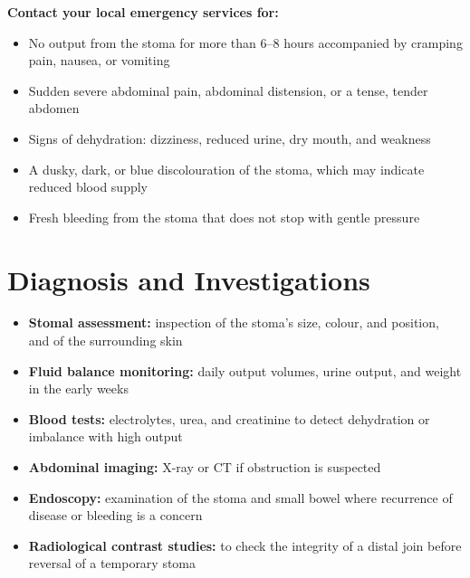 \textbf{Contact your local emergency services for:}
\begin{itemize}
    \item No output from the stoma for more than 6--8 hours accompanied by cramping pain, nausea, or vomiting
    \item Sudden severe abdominal pain, abdominal distension, or a tense, tender abdomen
    \item Signs of dehydration: dizziness, reduced urine, dry mouth, and weakness
    \item A dusky, dark, or blue discolouration of the stoma, which may indicate reduced blood supply
    \item Fresh bleeding from the stoma that does not stop with gentle pressure
\end{itemize}

\section*{Diagnosis and Investigations}
\begin{itemize}
    \item \textbf{Stomal assessment:} inspection of the stoma's size, colour, and position, and of the surrounding skin
    \item \textbf{Fluid balance monitoring:} daily output volumes, urine output, and weight in the early weeks
    \item \textbf{Blood tests:} electrolytes, urea, and creatinine to detect dehydration or imbalance with high output
    \item \textbf{Abdominal imaging:} X-ray or CT if obstruction is suspected
    \item \textbf{Endoscopy:} examination of the stoma and small bowel where recurrence of disease or bleeding is a concern
    \item \textbf{Radiological contrast studies:} to check the integrity of a distal join before reversal of a temporary stoma
\end{itemize}

